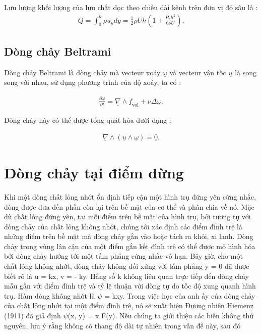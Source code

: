 \documentclass[CO_LUU_CHAT.tex]{subfiles}
\begin{document}
Lưu lượng khối lượng của lưu chất dọc theo chiều dài kênh trên đơn vị độ sâu là :
\begin{equation}
	\begin{aligned}
        Q=\int_0^h\rho u_ydy=\frac{1}{2}\rho Uh\left(1+\frac{P_xh^2}{6\nu U}\right).
	\end{aligned}
\end{equation}

\subsection{Dòng chảy Beltrami}

Dòng chảy Beltrami là dòng chảy mà vecteur xoáy $\underline{\omega}$ và vecteur vận tốc $\underline{u}$ là song song với nhau, sử dụng phương trình của độ xoáy, ta có :

\begin{equation}
	\begin{aligned}
        \frac{\partial\underline{\omega}}{\partial t}=\underline{\nabla}\wedge\underline{f}_{\text{vol}}+\nu\Delta\underline{\omega}.
	\end{aligned}
\end{equation}

Dòng chảy này có thể được tổng quát hóa dưới dạng :

\begin{equation}
	\begin{aligned}
		\underline{\nabla}\wedge\left(\underline{u}\wedge\underline{\omega}\right)=\underline{0}.
	\end{aligned}
\end{equation}



\section{Dòng chảy tại điểm dừng}

Khi một dòng chất lỏng nhớt ổn định tiếp cận một hình trụ đứng yên cứng nhắc,
dòng được đưa đến phần còn lại trên bề mặt của cơ thể và phân chia về nó.
Mặc dù chất lỏng đứng yên, tại mỗi điểm trên bề mặt của hình trụ, bởi
tương tự với dòng chảy của chất lỏng không nhớt, chúng tôi xác định các điểm đình trệ là
những điểm trên bề mặt mà dòng chảy gắn vào hoặc tách ra khỏi,
xi lanh. Dòng chảy trong vùng lân cận của một điểm gắn kết đình trệ
có thể được mô hình hóa bởi dòng chảy hướng tới một tấm phẳng cứng nhắc vô hạn. Bây giờ, cho một
chất lỏng không nhớt, dòng chảy không đối xứng với tấm phẳng y = 0 đã được biết rõ
là u = kx, v = - ky. Hằng số k không liên quan trực tiếp đến dòng chảy
mẫu gần với điểm đình trệ và tỷ lệ thuận với dòng tự do
tốc độ xung quanh hình trụ. Hàm dòng không nhớt là $\psi$ = kxy. Trong việc học của anh ấy
của dòng chảy của chất lỏng nhớt tại một điểm đình trệ, nó sẽ xuất hiện
Đương nhiên Hiemenz (1911) đã giả định $\psi$(x, y) = x F(y). Nếu chúng ta
giới thiệu các biến không thứ nguyên, lưu ý rằng không có thang độ dài tự nhiên
trong vấn đề này, sau đó
\end{document}
